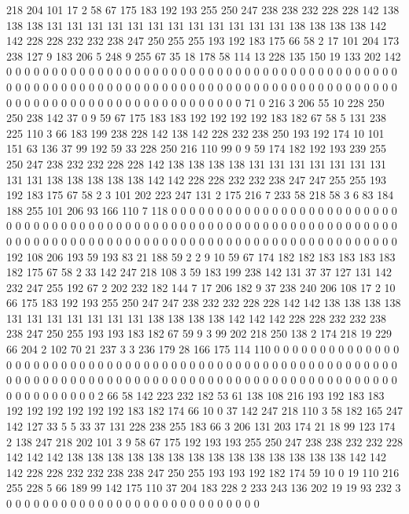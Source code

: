 218 204 101 17 2 58 67 175 183 192 193 255 250 247 238 238 232 228 228 142
138 138 138 131 131 131 131 131 131 131 131 131 131 131 131 138 138 138 138 142
142 228 228 232 232 238 247 250 255 255 193 192 183 175 66 58 2 17 101 204
173 238 127 9 183 206 5 248 9 255 67 35 18 178 58 114 13 228 135 150
19 133 202 142 0 0 0 0 0 0 0 0 0 0 0 0 0 0 0 0
0 0 0 0 0 0 0 0 0 0 0 0 0 0 0 0 0 0 0 0
0 0 0 0 0 0 0 0 0 0 0 0 0 0 0 0 0 0 0 0
0 0 0 0 0 0 0 0 0 0 0 0 0 0 0 0 0 0 0 0
0 0 0 0 0 0 0 0 0 0 0 0 0 0 0 0 0 0 0 0
0 0 0 0 0 0 0 0 0 0 0 0 0 0 0 0 71 0 216 3
206 55 10 228 250 250 238 142 37 0 9 59 67 175 183 183 192 192 192 192
183 182 67 58 5 131 238 225 110 3 66 183 199 238 228 142 138 142 228 232
238 250 193 192 174 10 101 151 63 136 37 99 192 59 33 228 250 216 110 99
0 9 59 174 182 192 193 239 255 250 247 238 232 232 228 228 142 138 138 138
138 131 131 131 131 131 131 131 131 131 138 138 138 138 138 142 142 228 228 232
232 238 247 247 255 255 193 192 183 175 67 58 2 3 101 202 223 247 131 2
175 216 7 233 58 218 58 3 6 83 184 188 255 101 206 93 166 110 7 118
0 0 0 0 0 0 0 0 0 0 0 0 0 0 0 0 0 0 0 0
0 0 0 0 0 0 0 0 0 0 0 0 0 0 0 0 0 0 0 0
0 0 0 0 0 0 0 0 0 0 0 0 0 0 0 0 0 0 0 0
0 0 0 0 0 0 0 0 0 0 0 0 0 0 0 0 0 0 0 0
0 0 0 0 0 0 0 0 0 0 0 0 0 0 0 0 0 0 0 0
0 0 0 0 0 0 0 0 0 0 0 192 108 206 193 59 193 83 21 188
59 2 2 9 10 59 67 174 182 182 183 183 183 183 182 175 67 58 2 33
142 247 218 108 3 59 183 199 238 142 131 37 37 127 131 142 232 247 255 192
67 2 202 232 182 144 7 17 206 182 9 37 238 240 206 108 17 2 10 66
175 183 192 193 255 250 247 247 238 232 232 228 228 142 142 138 138 138 138 131
131 131 131 131 131 131 138 138 138 138 142 142 142 228 228 232 232 238 238 247
250 255 193 193 183 182 67 59 9 3 99 202 218 250 138 2 174 218 19 229
66 204 2 102 70 21 237 3 3 236 179 28 166 175 114 110 0 0 0 0
0 0 0 0 0 0 0 0 0 0 0 0 0 0 0 0 0 0 0 0
0 0 0 0 0 0 0 0 0 0 0 0 0 0 0 0 0 0 0 0
0 0 0 0 0 0 0 0 0 0 0 0 0 0 0 0 0 0 0 0
0 0 0 0 0 0 0 0 0 0 0 0 0 0 0 0 0 0 0 0
0 0 0 0 0 0 0 0 0 0 0 0 0 0 0 0 0 0 0 0
0 0 0 0 0 0 2 66 58 142 223 232 182 53 61 138 108 216 193 192
183 183 192 192 192 192 192 192 183 182 174 66 10 0 37 142 247 218 110 3
58 182 165 247 142 127 33 5 5 33 37 131 228 238 255 183 66 3 206 131
203 174 21 18 99 123 174 2 138 247 218 202 101 3 9 58 67 175 192 193
193 255 250 247 238 238 232 232 228 142 142 142 138 138 138 138 138 138 138 138
138 138 138 138 138 138 142 142 142 228 228 232 232 238 238 247 250 255 193 193
192 182 174 59 10 0 19 110 216 255 228 5 66 189 99 142 175 110 37 204
183 228 2 233 243 136 202 19 19 93 232 3 0 0 0 0 0 0 0 0
0 0 0 0 0 0 0 0 0 0 0 0 0 0 0 0 0 0 0 0
